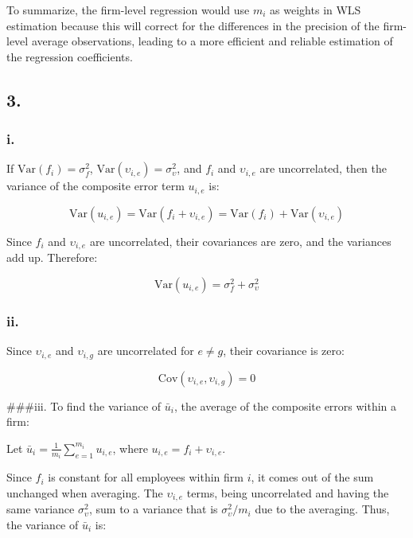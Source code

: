 \documentclass[
]{article}
\begin{document}
To summarize, the firm-level regression would use \(m_i\) as weights in
WLS estimation because this will correct for the differences in the
precision of the firm-level average observations, leading to a more
efficient and reliable estimation of the regression coefficients.

\hypertarget{section-2}{%
\subsection{3.}\label{section-2}}

\hypertarget{i.}{%
\subsubsection{i.}\label{i.}}

If \(\text{Var}(f_i) = \sigma_f^2\),
\(\text{Var}(\upsilon_{i,e}) = \sigma_\upsilon^2\), and \(f_i\) and
\(\upsilon_{i,e}\) are uncorrelated, then the variance of the composite
error term \(u_{i,e}\) is:

\[ \text{Var}(u_{i,e}) = \text{Var}(f_i + \upsilon_{i,e}) = \text{Var}(f_i) + \text{Var}(\upsilon_{i,e}) \]

Since \(f_i\) and \(\upsilon_{i,e}\) are uncorrelated, their covariances
are zero, and the variances add up. Therefore:

\[ \text{Var}(u_{i,e}) = \sigma_f^2 + \sigma_\upsilon^2 \]

\hypertarget{ii.}{%
\subsubsection{ii.}\label{ii.}}

Since \(\upsilon_{i,e}\) and \(\upsilon_{i,g}\) are uncorrelated for
\(e \neq g\), their covariance is zero:

\[ \text{Cov}(\upsilon_{i,e}, \upsilon_{i,g}) = 0 \]

\#\#\#iii. To find the variance of \(\bar{u}_i\), the average of the
composite errors within a firm:

Let \(\bar{u}_i = \frac{1}{m_i} \sum_{e=1}^{m_i} u_{i,e}\), where
\(u_{i,e} = f_i + \upsilon_{i,e}\).

Since \(f_i\) is constant for all employees within firm \(i\), it comes
out of the sum unchanged when averaging. The \(\upsilon_{i,e}\) terms,
being uncorrelated and having the same variance \(\sigma_\upsilon^2\),
sum to a variance that is \(\sigma_\upsilon^2 / m_i\) due to the
averaging. Thus, the variance of \(\bar{u}_i\) is:
\end{document}
